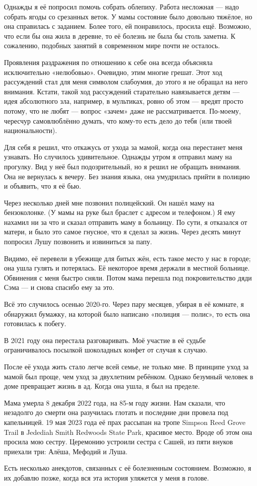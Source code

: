 Однажды я её попросил помочь собрать облепиху.
Работа несложная --- надо собрать ягоды со срезанных веток.
У мамы состояние было довольно тяжёлое, но она справилась с заданием. 
Более того, ей понравилось, просила ещё.
Возможно, что если бы она жила в деревне, то её болезнь не была бы столь заметна.
К сожалению, подобных занятий в современном мире почти не осталось.

Проявления раздражения по отношению к себе она всегда объясняла исключительно «нелюбовью».
Очевидно, этим многие грешат.
Этот ход рассуждений стал для меня символом слабоумия, до этого я не обращал на него внимания.
Кстати, такой ход рассуждений старательно навязывается детям --- идея абсолютного зла, например, в мультиках, ровно об этом --- вредят просто потому, что не любят --- вопрос «зачем» даже не рассматривается.
По-моему, чересчур самовлюблённо думать, что кому-то есть дело до тебя (или твоей национальности). 

Для себя я решил, что откажусь от ухода за мамой, когда она перестанет меня узнавать.
Но случилось удивительное.
Однажды утром я отправил маму на прогулку.
Вид у неё был подозрительный, но я решил не обращать внимания.
Она не вернулась к вечеру.
Без знания языка, она умудрилась прийти в полицию и объявить, что я её бью.

Через несколько дней мне позвонил полицейский.
Он нашёл маму на бензоколонке.
(У мамы на руке был браслет с адресом и телефоном.)
Я ему нахамил ни за что и сказал отправить маму в больницу.
По сути, я отказался от матери, и было это самое гнусное, что я сделал за жизнь.
Через десять минут попросил Лушу позвонить и извиниться за папу.

Видимо, её перевели в убежище для битых жён, есть такое место у нас в городе;
она ушла гулять и потерялась.
Её некоторое время держали в местной больнице.
Обвинения с меня быстро сняли. 
Потом мама перешла под покровительство дяди Сэма --- и снова спасибо ему за это.

Всё это случилось осенью 2020-го.
Через пару месяцев, убирая в её комнате, я обнаружил бумажку, на которой было написано «полиция --- полис»,
то есть она готовилась к побегу.

В 2021 году она перестала разговаривать.
Моё участие в её судьбе ограничивалось посылкой шоколадных конфет от случая к случаю.

После её ухода жить стало легче всей семье, не только мне.
В принципе уход за мамой был проще, чем уход за двухлетним ребёнком.
Однако безумный человек в доме превращает жизнь в ад.
Когда она ушла, я был на пределе.

Мама умерла 8 декабря 2022 года, на 85-м году жизни.
Нам сказали, что незадолго до смерти она разучилась глотать и последние дни провела под капельницей.
19 мая 2023 года её прах рассыпан на тропе Simpson Reed Grove Trail в Jedediah Smith Redwoods State Park,
красивое место.
Вроде об этом она просила мою сестру.
Церемонию устроили сестра с Сашей, из пяти внуков приехали три: Алёша, Мефодий и Луша.

Есть несколько анекдотов, связанных с её болезненным состоянием.
Возможно, я их добавлю позже, когда вся эта история уляжется у меня в голове.
